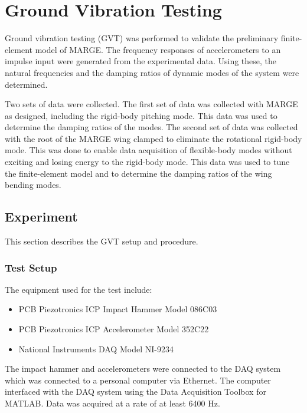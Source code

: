 \chapter{Ground Vibration Testing}
\label{ch:gvt}

Ground vibration testing (GVT) was performed to validate the preliminary finite-element model of MARGE. The frequency responses of accelerometers to an impulse input were generated from the experimental data. Using these, the natural frequencies and the damping ratios of dynamic modes of the system were determined.

Two sets of data were collected. The first set of data was collected with MARGE as designed, including the rigid-body pitching mode. This data was used to determine the damping ratios of the modes. The second set of data was collected with the root of the MARGE wing clamped to eliminate the rotational rigid-body mode. This was done to enable data acquisition of flexible-body modes without exciting and losing energy to the rigid-body mode. This data was used to tune the finite-element model and to determine the damping ratios of the wing bending modes.

\section{Experiment} %

This section describes the GVT setup and procedure.

\subsection{Test Setup}

The equipment used for the test include:
\begin{itemize}
    \item PCB Piezotronics ICP Impact Hammer Model 086C03
    \item PCB Piezotronics ICP Accelerometer Model 352C22
    \item National Instruments DAQ Model NI-9234
\end{itemize}
The impact hammer and accelerometers were connected to the DAQ system which was connected to a personal computer via Ethernet. The computer interfaced with the DAQ system using the Data Acquisition Toolbox for MATLAB. Data was acquired at a rate of at least 6400 Hz.

